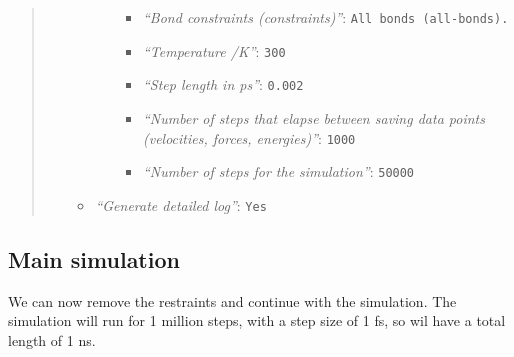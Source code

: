\documentclass[twocolumn]{bmcart}%
\providecommand{\tightlist}{%
  \setlength{\itemsep}{0pt}\setlength{\parskip}{0pt}}
\providecommand{\tightlist}{%
  \setlength{\itemsep}{0pt}\setlength{\parskip}{0pt}}
\begin{document}
\begin{quote}
\begin{enumerate}
\begin{itemize}
\begin{itemize}
      \begin{itemize}
      \tightlist
      \item
        \emph{``Bond constraints (constraints)''}:
        \texttt{All\ bonds\ (all-bonds).}
      \item
        \emph{``Temperature /K''}: \texttt{300}
      \item
        \emph{``Step length in ps''}: \texttt{0.002}
      \item
        \emph{``Number of steps that elapse between saving data points
        (velocities, forces, energies)''}: \texttt{1000}
      \item
        \emph{``Number of steps for the simulation''}: \texttt{50000}
      \end{itemize}
    \end{itemize}
  \item
    \emph{``Generate detailed log''}: \texttt{Yes}
  \end{itemize}
\end{enumerate}

\end{quote}

\subsection{Main simulation}\label{main-simulation}

We can now remove the restraints and continue with the simulation. The
simulation will run for 1 million steps, with a step size of 1 fs, so
wil have a total length of 1 ns.
\end{document}
